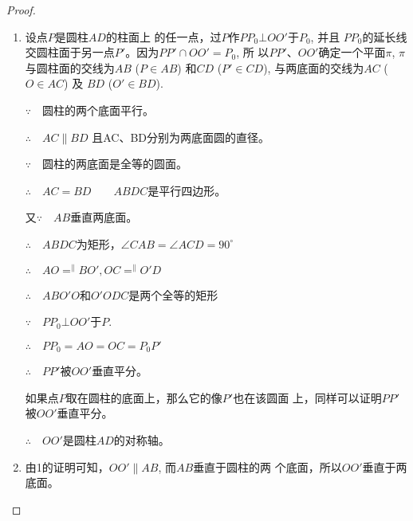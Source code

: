 \begin{figure}[htp]
    \centering
{}
    \caption{}
\end{figure}


\begin{proof}
\begin{enumerate}
    \item 

设点$P$是圆柱$AD$的柱面上
的任一点，过$P$作$PP_0\bot OO'$于$P_0$, 并且
$PP_0$的延长线交圆柱面于另一点$P'$。因为$PP'\cap OO'=P_0$, 所
以$PP'$、$OO'$确定一个平面$\pi$, $\pi$与圆柱面的交线为$AB$ ($P\in
AB$) 和$CD$ ($P'\in CD$), 与两底面的交线为$AC$ ($O\in AC$) 及
$BD$ ($O'\in BD$).

$\because\quad $圆柱的两个底面平行。

$\therefore\quad AC\parallel BD$ 且AC、BD分别为两底面圆的直径。

$\because\quad $圆柱的两底面是全等的圆面。

$\therefore\quad AC=BD\qquad ABDC$是平行四边形。

又$\because\quad AB$垂直两底面。

$\therefore\quad ABDC$为矩形，$\angle CAB=\angle ACD=90^{\circ}$

$\therefore\quad AO\displaystyle\mathop{=}^{\parallel}BO', OC\displaystyle\mathop{=}^{\parallel}O'D$

$\therefore\quad ABO'O$和$O'ODC$是两个全等的矩形

$\because\quad PP_0\bot OO'$于$P$.

$\therefore\quad PP_0=AO=OC=P_0P'$

$\therefore\quad PP'$被$OO'$垂直平分。

如果点$P$取在圆柱的底面上，那么它的像$P'$也在该圆面
上，同样可以证明$PP'$被$OO'$垂直平分。

$\therefore\quad OO'$是圆柱$AD$的对称轴。

\item 由1的证明可知，$OO'\parallel AB$, 而$AB$垂直于圆柱的两
个底面，所以$OO'$垂直于两底面。
\end{enumerate}
\end{proof}

